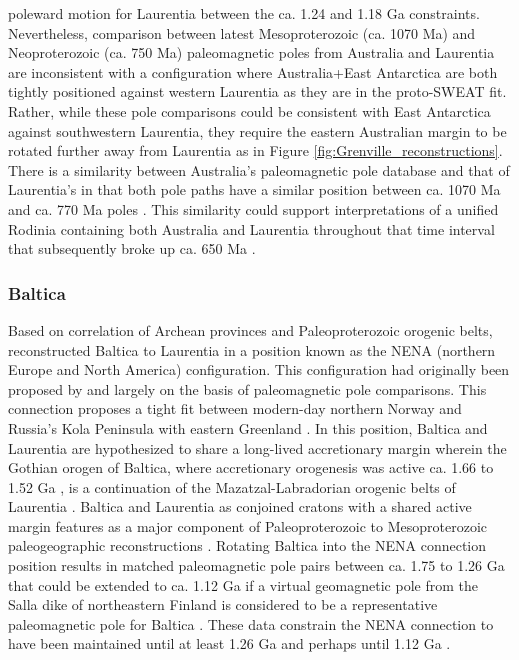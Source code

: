 \documentclass[twocolumn, switch]{article} %
\begin{document}
poleward motion for Laurentia between the ca. 1.24 and 1.18 Ga constraints. Nevertheless, comparison between latest Mesoproterozoic (ca. 1070 Ma) and Neoproterozoic (ca. 750 Ma) paleomagnetic poles from Australia and Laurentia are inconsistent with a configuration where Australia+East Antarctica are both tightly positioned against western Laurentia as they are in the proto-SWEAT fit. Rather, while these pole comparisons could be consistent with East Antarctica against southwestern Laurentia, they require the eastern Australian margin to be rotated further away from Laurentia as in Figure \ref{fig:Grenville_reconstructions}. There is a similarity between Australia's paleomagnetic pole database and that of Laurentia's in that both pole paths have a similar position between ca. 1070 Ma and ca. 770 Ma poles \citep{Swanson-Hysell2012a}. This similarity could support interpretations of a unified Rodinia containing both Australia and Laurentia throughout that time interval \citep{Swanson-Hysell2012a} that subsequently broke up ca. 650 Ma \citep{Li2011a}.

\subsubsection{Baltica}

Based on correlation of Archean provinces and Paleoproterozoic orogenic belts, \cite{Gower1990a} reconstructed Baltica to Laurentia in a position known as the NENA (northern Europe and North America) configuration. This configuration had originally been proposed by \citet{Patchett1978a} and \citet{Piper1980a} largely on the basis of paleomagnetic pole comparisons. This connection proposes a tight fit between modern-day northern Norway and Russia's Kola Peninsula with eastern Greenland \citep{Gower1990a, Salminen2021b}. In this position, Baltica and Laurentia are hypothesized to share a long-lived accretionary margin wherein the Gothian orogen of Baltica, where accretionary orogenesis was active ca. 1.66 to 1.52 Ga \citep{Bergstrom2020a}, is a continuation of the Mazatzal-Labradorian orogenic belts of Laurentia \citep{Karlstrom2001a}. Baltica and Laurentia as conjoined cratons with a shared active margin features as a major component of Paleoproterozoic to Mesoproterozoic paleogeographic reconstructions \citep{Evans2011a, Zhang2012a, Elming2021a}. Rotating Baltica into the NENA connection position results in matched paleomagnetic pole pairs between ca. 1.75 to 1.26 Ga \citep{Buchan2000a, Evans2008a} that could be extended to ca. 1.12 Ga if a virtual geomagnetic pole from the Salla dike of northeastern Finland is considered to be a representative paleomagnetic pole for Baltica \citep{Salminen2009b}. These data constrain the NENA connection to have been maintained until at least 1.26 Ga and perhaps until 1.12 Ga \citep{Salminen2021b}. 
\end{document}
